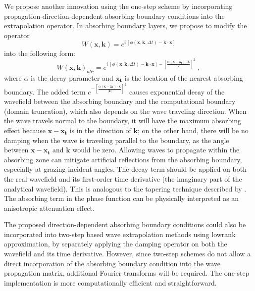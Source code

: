 We propose another innovation using the one-step scheme by incorporating propagation-direction-dependent absorbing boundary conditions into the extrapolation operator. In absorbing boundary layers, we propose to modify the operator
\begin{equation}
\label{eq:oper1}
W(\mathbf{x},\mathbf{k}) = e^{i\,\left[\phi(\mathbf{x},\mathbf{k},\Delta t)-\mathbf{k} \cdot \mathbf{x}\right]}
\end{equation}
into the following form:
\begin{equation}
\label{eq:oper2}
W(\mathbf{x},\mathbf{k})_{abc} = e^{i\,\left[\phi(\mathbf{x},\mathbf{k},\Delta t)-\mathbf{k} \cdot \mathbf{x}\right]-[\frac{\alpha (\mathbf{x}-\mathbf{x_t}) \cdot \mathbf{k}}{|\mathbf{k}|}]^2 } \; ,
\end{equation}
where $\alpha$ is the decay parameter and $\mathbf{x_t}$ is the location of the nearest absorbing boundary. The added term $e^{-[\frac{\alpha (\mathbf{x}-\mathbf{x_t}) \cdot \mathbf{k}}{|\mathbf{k}|}]^2}$ causes exponential decay of the wavefield between the absorbing boundary and the computational boundary (domain truncation), which also depends on the wave traveling direction. When the wave travels normal to the boundary, it will have the maximum absorbing effect because $\mathbf{x}-\mathbf{x_t}$ is in the direction of $\mathbf{k}$; on the other hand, there will be no damping when the wave is traveling parallel to the boundary, as the angle between $\mathbf{x}-\mathbf{x_t}$ and $\mathbf{k}$ would be zero. Allowing waves to propagate within the absorbing zone can mitigate artificial reflections from the absorbing boundary, especially at grazing incident angles. The decay term should be applied on both the real wavefield and its first-order time derivative (the imaginary part of the analytical wavefield). This is analogous to the tapering technique described by \cite{cerjan}. The absorbing term in the phase function can be physically interpreted as an anisotropic attenuation effect.

The proposed direction-dependent absorbing boundary conditions could also be incorporated into two-step based wave extrapolation methods \cite[]{lowrank,song,fang14} using lowrank approximation, by separately applying the damping operator on both the wavefield and its time derivative. However, since two-step schemes do not allow a direct incorporation of the absorbing boundary condition into the wave propagation matrix, additional Fourier transforms will be required. The one-step implementation is more computationally efficient and straightforward.

